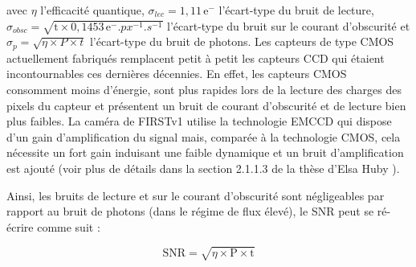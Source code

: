 \noindent avec $\eta$ l'efficacité quantique, $\sigma_{lec} = 1,11 \,\text{e}^-$ l'écart-type du bruit de lecture, $\sigma_{obsc} = \sqrt{\text{t} \times 0,1453 \,\text{e}^-.px^{-1}.s^{-1}}$ l'écart-type du bruit sur le courant d'obscurité et $\sigma_{p} = \sqrt{\eta \times P \times t}$ l'écart-type du bruit de photons. Les capteurs de type \ac{CMOS} actuellement fabriqués remplacent petit à petit les capteurs \ac{CCD} qui étaient incontournables ces dernières décennies. En effet, les capteurs \ac{CMOS} consomment moins d'énergie, sont plus rapides lors de la lecture des charges des pixels du capteur et présentent un bruit de courant d'obscurité et de lecture bien plus faibles. La caméra de \ac{FIRSTv1} utilise la technologie \ac{EMCCD} qui dispose d'un gain d'amplification du signal mais, comparée à la technologie \ac{CMOS}, cela nécessite un fort gain induisant une faible dynamique et un bruit d'amplification est ajouté (voir plus de détails dans la section 2.1.1.3 de la thèse d'Elsa Huby \cite{huby2013these}).


Ainsi, les bruits de lecture et sur le courant d'obscurité sont négligeables par rapport au bruit de photons (dans le régime de flux élevé), le \ac{SNR} peut se ré-écrire comme suit :

\begin{equation}
    \text{SNR} = \sqrt{\eta \times \text{P} \times \text{t}}
\end{equation}

